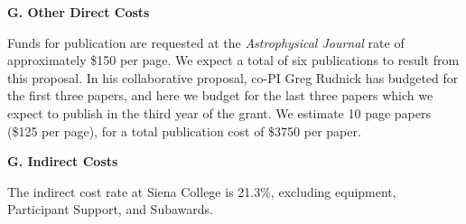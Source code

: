 \documentclass[preprint,11pt]{aastex}
\begin{document}
\begin{center}
{\bf \large G. Other Direct Costs}
\end{center}



Funds for publication are requested at the {\it Astrophysical Journal} rate of approximately \$150 per page.
We expect a total of six publications to result from this proposal.
In his collaborative proposal, co-PI Greg Rudnick has budgeted for the
first three papers, and here we budget for the last three papers which
we expect to publish in the third year of the grant.  We estimate 10
page papers (\$125 per page), for a total publication cost of \$3750 per paper.







\begin{center}
{\bf \large G. Indirect Costs}
\end{center}

The indirect cost rate at Siena College is 21.3\%, excluding
equipment, Participant Support, and Subawards.  
\end{document}
